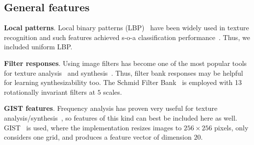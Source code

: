 
\subsection{General features}



\textbf{Local patterns}. Local binary patterns (LBP)~\citep{lbp:2002}
have been widely used in texture recognition and such features 
achieved s-o-a classification performance~\citep{sorted:texture}. Thus, 
we included uniform LBP.

\textbf{Filter responses}. Using image filters has become one of the
most popular tools for texture analysis~\citep{texton:2001, Manjunath96}
and synthesis~\citep{zhu:frame}. Thus, filter bank responses may 
be helpful for learning synthesizability too. The Schmid Filter
Bank~\citep{Schmid01} is employed with 13 rotationally invariant
filters at $5$ scales. 

\textbf{GIST features}. Frequency analysis has proven very useful for
texture analysis/synthesis~\citep{vangool83, Manjunath96, Debonet:97}, so features 
of this kind can best be included here as well. GIST~\citep{gist} is used, 
where the implementation resizes images to $256 \times 256$ pixels, only
considers one grid, and produces a feature vector of dimension $20$.




